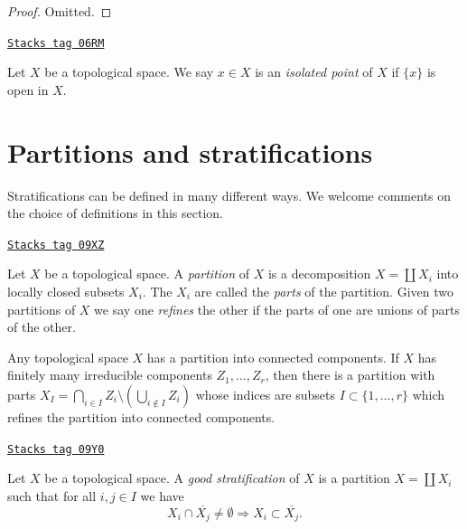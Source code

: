 \begin{proof}
Omitted.
\end{proof}

\begin{definition}
\label{topology-definition-isolated-point}
\href{https://stacks.math.columbia.edu/tag/06RM}{\texttt{Stacks tag 06RM}}

Let $X$ be a topological space. We say $x \in X$ is an
{\it isolated point} of $X$ if $\{x\}$ is open in $X$.
\end{definition}

\section{Partitions and stratifications}
\label{topology-section-stratifications}
Stratifications can be defined in many different ways. We welcome
comments on the choice of definitions in this section.

\begin{definition}[Paritition]
\label{topology-definition-paritition}
\href{https://stacks.math.columbia.edu/tag/09XZ}{\texttt{Stacks tag 09XZ}}

Let $X$ be a topological space. A {\it partition} of $X$ is a
decomposition $X = \coprod X_i$ into locally closed subsets $X_i$.
The $X_i$ are called the {\it parts} of the partition.
Given two partitions of $X$ we say one {\it refines} the other if
the parts of one are unions of parts of the other.
\end{definition}

Any topological space $X$ has a partition into connected components.
If $X$ has finitely many irreducible components $Z_1, \ldots, Z_r$,
then there is a partition with parts
$X_I = \bigcap_{i \in I} Z_i \setminus (\bigcup_{i \not \in I} Z_i)$
whose indices are subsets $I \subset \{1, \ldots, r\}$
which refines the partition into connected components.

\begin{definition}
\label{topology-definition-good-stratification}
\href{https://stacks.math.columbia.edu/tag/09Y0}{\texttt{Stacks tag 09Y0}}

Let $X$ be a topological space. A {\it good stratification}
of $X$ is a partition $X = \coprod X_i$ such that for all
$i, j \in I$ we have
$$
X_i \cap \overline{X_j} \not = \emptyset
\Rightarrow
X_i \subset \overline{X_j}.
$$
\end{definition}

